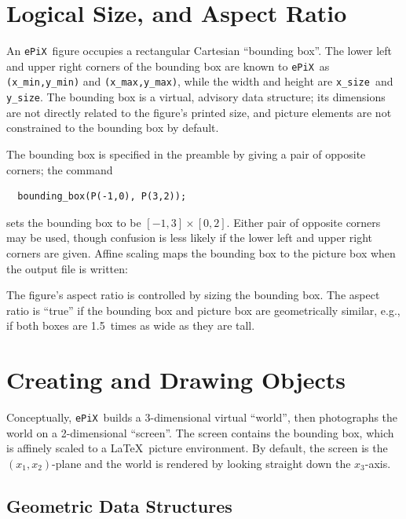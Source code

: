 \documentclass[12pt]{report}
\newcommand{\code}[1]{\texttt{#1}}
\newcommand{\ePiX}{\code{ePiX}}
\begin{document}
\section{Logical Size, and Aspect Ratio}

An \ePiX\ figure occupies a rectangular Cartesian ``bounding box''.
The lower left and upper right corners of the bounding box are known
to \ePiX\ as \code{(x\_min,y\_min)} and \code{(x\_max,y\_max)}, while
the width and height are \code{x\_size}~and \code{y\_size}. The
bounding box is a virtual, advisory data structure; its dimensions are
not directly related to the figure's printed size, and picture
elements are not constrained to the bounding box by default.

The bounding box is specified in the preamble by giving a pair of
opposite corners; the command
\begin{verbatim}
  bounding_box(P(-1,0), P(3,2));
\end{verbatim}
sets the bounding box to be $[-1,3]\times[0,2]$. Either pair of
opposite corners may be used, though confusion is less likely if the
lower left and upper right corners are given.  Affine scaling maps the
bounding box to the picture box when the output file is written:
\begin{center}

\end{center}
\label{page:scaling}
The figure's aspect ratio is controlled by sizing the bounding box.
The aspect ratio is ``true'' if the bounding box and picture box are
geometrically similar, e.g., if both boxes are 1.5~times as wide as
they are tall.


\section{Creating and Drawing Objects}

Conceptually, \ePiX\ builds a 3-dimensional virtual ``world'', then
photographs the world on a 2-dimensional ``screen''. The screen
contains the bounding box, which is affinely scaled to a \LaTeX\ 
picture environment. By default, the screen is the $(x_1,x_2)$-plane
and the world is rendered by looking straight down the $x_3$-axis.
\index{Bounding Box|)}

\subsection*{Geometric Data Structures}
\end{document}
